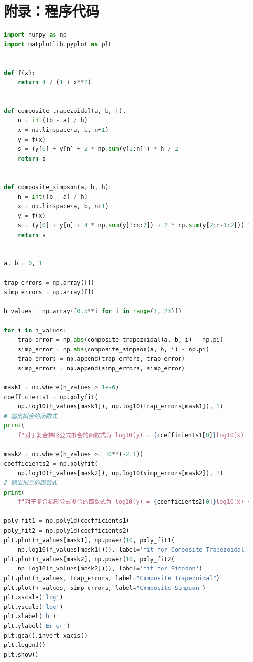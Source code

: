 \documentclass[a4paper,11pt,notitlepage]{article}
\begin{document}
\section{附录：程序代码}
\begin{lstlisting}[language=Python,caption={Fifth Chapter 1A.py},label={code1.1}]
import numpy as np
import matplotlib.pyplot as plt


def f(x):
    return 4 / (1 + x**2)


def composite_trapezoidal(a, b, h):
    n = int((b - a) / h)
    x = np.linspace(a, b, n+1)
    y = f(x)
    s = (y[0] + y[n] + 2 * np.sum(y[1:n])) * h / 2
    return s


def composite_simpson(a, b, h):
    n = int((b - a) / h)
    x = np.linspace(a, b, n+1)
    y = f(x)
    s = (y[0] + y[n] + 4 * np.sum(y[1:n:2]) + 2 * np.sum(y[2:n-1:2])) * h / 3
    return s


a, b = 0, 1

trap_errors = np.array([])
simp_errors = np.array([])

h_values = np.array([0.5**i for i in range(1, 23)])

for i in h_values:
    trap_error = np.abs(composite_trapezoidal(a, b, i) - np.pi)
    simp_error = np.abs(composite_simpson(a, b, i) - np.pi)
    trap_errors = np.append(trap_errors, trap_error)
    simp_errors = np.append(simp_errors, simp_error)

mask1 = np.where(h_values > 1e-6)
coefficients1 = np.polyfit(
    np.log10(h_values[mask1]), np.log10(trap_errors[mask1]), 1)
# 输出拟合的函数式
print(
    f"对于复合梯形公式拟合的函数式为 log10(y) = {coefficients1[0]}log10(x) + {coefficients1[1]}")

mask2 = np.where(h_values >= 10**(-2.1))
coefficients2 = np.polyfit(
    np.log10(h_values[mask2]), np.log10(simp_errors[mask2]), 1)
# 输出拟合的函数式
print(
    f"对于复合梯形公式拟合的函数式为 log10(y) = {coefficients2[0]}log10(x) + {coefficients2[1]}")

poly_fit1 = np.poly1d(coefficients1)
poly_fit2 = np.poly1d(coefficients2)
plt.plot(h_values[mask1], np.power(10, poly_fit1(
    np.log10(h_values[mask1]))), label='fit for Composite Trapezoidal')
plt.plot(h_values[mask2], np.power(10, poly_fit2(
    np.log10(h_values[mask2]))), label='fit for Simpson')
plt.plot(h_values, trap_errors, label="Composite Trapezoidal")
plt.plot(h_values, simp_errors, label="Composite Simpson")
plt.xscale('log')
plt.yscale('log')
plt.xlabel('h')
plt.ylabel('Error')
plt.gca().invert_xaxis()
plt.legend()
plt.show()    
\end{lstlisting}
\end{document}
